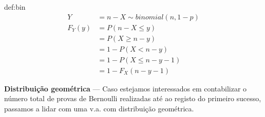 \begin{theo}{def:bin}
\vspace{-1 em}
\begin{align*}
    Y &= n - X \sim binomial(n, 1 - p)\\[4pt]
    F_Y(y) &= P(n - X \leq y)\\
    &= P(X \ge n - y)\\
    &= 1 - P(X < n - y)\\
    &= 1 - P(X \leq n - y - 1)\\
    &= 1 - F_X(n - y - 1)
\end{align*}
\vspace{0.5 em}
\end{theo}

\newpage
\noindent \textbf{Distribuição geométrica} --- Caso estejamos interessados em contabilizar o número total de provas de Bernoulli realizadas até ao registo do primeiro sucesso, passamos a lidar com uma v.a. com distribuição geométrica.

